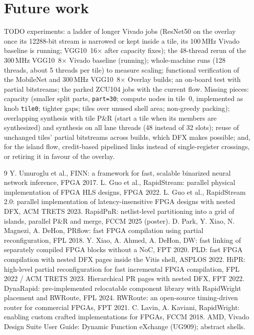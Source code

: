 \documentclass[10pt,twocolumn]{article}
\newcommand{\code}[1]{\texttt{\small #1}}
\begin{document}
\section{Future work}
TODO experiments: a ladder of longer Vivado jobs (ResNet50 on the overlay once its 12288-bit
stream is narrowed or kept inside a tile, its 100\,MHz Vivado baseline is running; VGG10~16$\times$
after capacity fixes); the 48-thread rerun of the 300\,MHz
VGG10~8$\times$ Vivado baseline (running); whole-machine runs (128 threads, about 5 threads per
tile) to measure scaling; functional verification of the MobileNet and 300\,MHz
VGG10~8$\times$ Overlay builds; an on-board test with partial bitstreams; the parked ZCU104 jobs
with the current flow.
Missing pieces: capacity (smaller split parts, \code{part=30}; compute nodes in tile~0, implemented
as knob \code{tile0}; tighter gaps; tiles over unused shell area; non-greedy packing); overlapping
synthesis with tile P\&R (start a tile when its members are synthesized) and synthesis on all lane
threads (48 instead of 32 slots); reuse of unchanged tiles' partial bitstreams across builds,
which DFX makes possible; and, for the island flow, credit-based pipelined links instead of
single-register crossings, or retiring it in favour of the overlay.

\begin{thebibliography}{9}\footnotesize\setlength{\itemsep}{0pt}
 Y. Umuroglu et al., FINN: a framework for fast, scalable binarized neural network inference, FPGA 2017.
 L. Guo et al., RapidStream: parallel physical implementation of FPGA HLS designs, FPGA 2022.
 L. Guo et al., RapidStream 2.0: parallel implementation of latency-insensitive FPGA designs with nested DFX, ACM TRETS 2023.
 RapidPnR: netlist-level partitioning into a grid of islands, parallel P\&R and merge, FCCM 2025 (poster).
 D. Park, Y. Xiao, N. Magnezi, A. DeHon, PRflow: fast FPGA compilation using partial reconfiguration, FPL 2018.
 Y. Xiao, A. Ahmed, A. DeHon, DW: fast linking of separately compiled FPGA blocks without a NoC, FPT 2020.
 PLD: fast FPGA compilation with nested DFX pages inside the Vitis shell, ASPLOS 2022.
 HiPR: high-level partial reconfiguration for fast incremental FPGA compilation, FPL 2022 / ACM TRETS 2023.
 Hierarchical PR pages with nested DFX, FPT 2022.
 DynaRapid: pre-implemented relocatable component library with RapidWright placement and RWRoute, FPL 2024.
 RWRoute: an open-source timing-driven router for commercial FPGAs, FPT 2021.
 C. Lavin, A. Kaviani, RapidWright: enabling custom crafted implementations for FPGAs, FCCM 2018.
 AMD, Vivado Design Suite User Guide: Dynamic Function eXchange (UG909); abstract shells.
\end{thebibliography}
\end{document}
